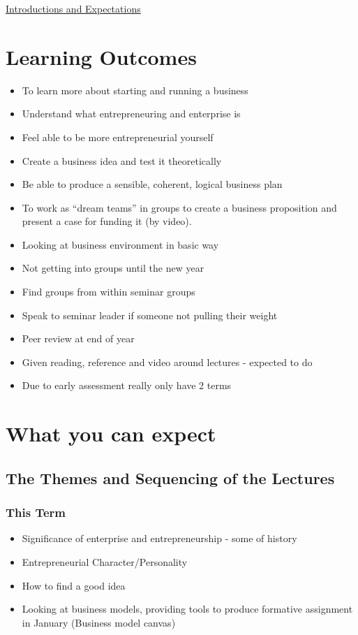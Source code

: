 \documentclass{article}[18pt]
\begin{document}
\begin{center}
\underline{\huge Introductions and Expectations}
\end{center}
\section{Learning Outcomes}
\begin{itemize}
\item To learn more about starting and
running a business
\item Understand what entrepreneuring and
enterprise is
\item Feel able to be more entrepreneurial
yourself
\item Create a business idea and test it
theoretically
\item Be able to produce a sensible, coherent,
logical business plan
\item To work as “dream teams” in groups to
create a business proposition and
present a case for funding it (by video). 
\item Looking at business environment in basic way
\item Not getting into groups until the new year
\item Find groups from within seminar groups
\item Speak to seminar leader if someone not pulling their weight
\item Peer review at end of year
\item Given reading, reference and video around lectures - expected to do
\item Due to early assessment really only have 2 terms
\end{itemize}
\section{What you can expect}
\subsection{The Themes and Sequencing of the Lectures}

\subsubsection{This Term}
\begin{itemize}
\item Significance of enterprise and entrepreneurship  - some of history
\item Entrepreneurial Character/Personality
\item How to find a good idea
\item Looking at business models, providing tools to produce formative assignment in January (Business model canvas)
\end{itemize}
\end{document}
